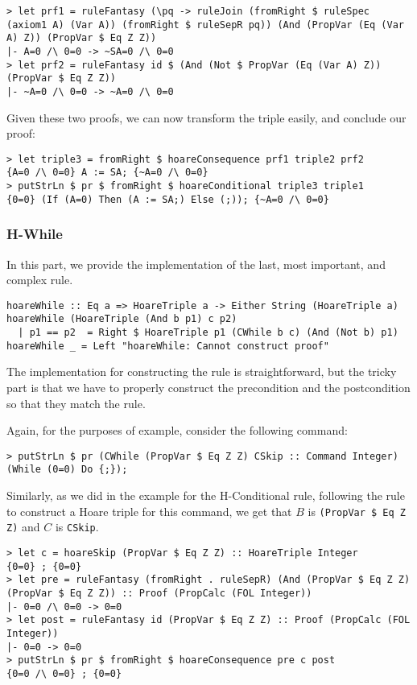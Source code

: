 \documentclass{article}
\begin{document}
\begin{lstlisting}
> let prf1 = ruleFantasy (\pq -> ruleJoin (fromRight $ ruleSpec (axiom1 A) (Var A)) (fromRight $ ruleSepR pq)) (And (PropVar (Eq (Var A) Z)) (PropVar $ Eq Z Z))
|- A=0 /\ 0=0 -> ~SA=0 /\ 0=0
> let prf2 = ruleFantasy id $ (And (Not $ PropVar (Eq (Var A) Z)) (PropVar $ Eq Z Z))
|- ~A=0 /\ 0=0 -> ~A=0 /\ 0=0
\end{lstlisting}

Given these two proofs, we can now transform the triple easily, and conclude our proof:

\begin{lstlisting}
> let triple3 = fromRight $ hoareConsequence prf1 triple2 prf2
{A=0 /\ 0=0} A := SA; {~A=0 /\ 0=0}
> putStrLn $ pr $ fromRight $ hoareConditional triple3 triple1
{0=0} (If (A=0) Then (A := SA;) Else (;)); {~A=0 /\ 0=0}
\end{lstlisting}

\subsubsection{H-While}

In this part, we provide the implementation of the last, most important, and complex rule.

\begin{lstlisting}
hoareWhile :: Eq a => HoareTriple a -> Either String (HoareTriple a)
hoareWhile (HoareTriple (And b p1) c p2)
  | p1 == p2  = Right $ HoareTriple p1 (CWhile b c) (And (Not b) p1)
hoareWhile _ = Left "hoareWhile: Cannot construct proof"
\end{lstlisting}

The implementation for constructing the rule is straightforward, but the tricky part is that we have to properly construct the precondition and the postcondition so that they match the rule.

Again, for the purposes of example, consider the following command:

\begin{lstlisting}
> putStrLn $ pr (CWhile (PropVar $ Eq Z Z) CSkip :: Command Integer)
(While (0=0) Do {;});
\end{lstlisting}

Similarly, as we did in the example for the H-Conditional rule, following the rule to construct a Hoare triple for this command, we get that $B$ is \texttt{(PropVar \$ Eq Z Z)} and $C$ is \texttt{CSkip}.

\begin{lstlisting}
> let c = hoareSkip (PropVar $ Eq Z Z) :: HoareTriple Integer
{0=0} ; {0=0}
> let pre = ruleFantasy (fromRight . ruleSepR) (And (PropVar $ Eq Z Z) (PropVar $ Eq Z Z)) :: Proof (PropCalc (FOL Integer))
|- 0=0 /\ 0=0 -> 0=0
> let post = ruleFantasy id (PropVar $ Eq Z Z) :: Proof (PropCalc (FOL Integer))
|- 0=0 -> 0=0
> putStrLn $ pr $ fromRight $ hoareConsequence pre c post
{0=0 /\ 0=0} ; {0=0}
\end{lstlisting}
\end{document}

